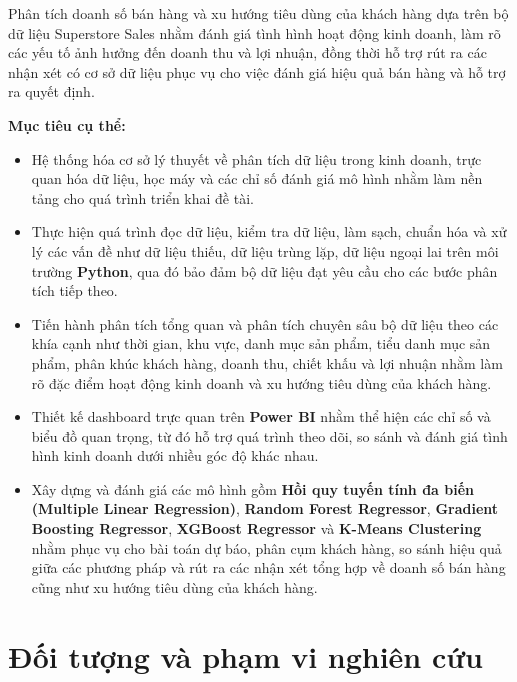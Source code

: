 Phân tích doanh số bán hàng và xu hướng tiêu dùng của khách hàng dựa trên bộ dữ liệu Superstore Sales nhằm đánh giá tình hình hoạt động kinh doanh, làm rõ các yếu tố ảnh hưởng đến doanh thu và lợi nhuận, đồng thời hỗ trợ rút ra các nhận xét có cơ sở dữ liệu phục vụ cho việc đánh giá hiệu quả bán hàng và hỗ trợ ra quyết định.

\textbf{Mục tiêu cụ thể:}

\begin{itemize}
    \item Hệ thống hóa cơ sở lý thuyết về phân tích dữ liệu trong kinh doanh, trực quan hóa dữ liệu, học máy và các chỉ số đánh giá mô hình nhằm làm nền tảng cho quá trình triển khai đề tài.
    
    \item Thực hiện quá trình đọc dữ liệu, kiểm tra dữ liệu, làm sạch, chuẩn hóa và xử lý các vấn đề như dữ liệu thiếu, dữ liệu trùng lặp, dữ liệu ngoại lai trên môi trường \textbf{Python}, qua đó bảo đảm bộ dữ liệu đạt yêu cầu cho các bước phân tích tiếp theo.
    
    \item Tiến hành phân tích tổng quan và phân tích chuyên sâu bộ dữ liệu theo các khía cạnh như thời gian, khu vực, danh mục sản phẩm, tiểu danh mục sản phẩm, phân khúc khách hàng, doanh thu, chiết khấu và lợi nhuận nhằm làm rõ đặc điểm hoạt động kinh doanh và xu hướng tiêu dùng của khách hàng.
    
    \item Thiết kế dashboard trực quan trên \textbf{Power BI} nhằm thể hiện các chỉ số và biểu đồ quan trọng, từ đó hỗ trợ quá trình theo dõi, so sánh và đánh giá tình hình kinh doanh dưới nhiều góc độ khác nhau.
    
    \item Xây dựng và đánh giá các mô hình gồm \textbf{Hồi quy tuyến tính đa biến (Multiple Linear Regression)}, \textbf{Random Forest Regressor}, \textbf{Gradient Boosting Regressor}, \textbf{XGBoost Regressor} và \textbf{K-Means Clustering} nhằm phục vụ cho bài toán dự báo, phân cụm khách hàng, so sánh hiệu quả giữa các phương pháp và rút ra các nhận xét tổng hợp về doanh số bán hàng cũng như xu hướng tiêu dùng của khách hàng.
\end{itemize}


\section{Đối tượng và phạm vi nghiên cứu}

